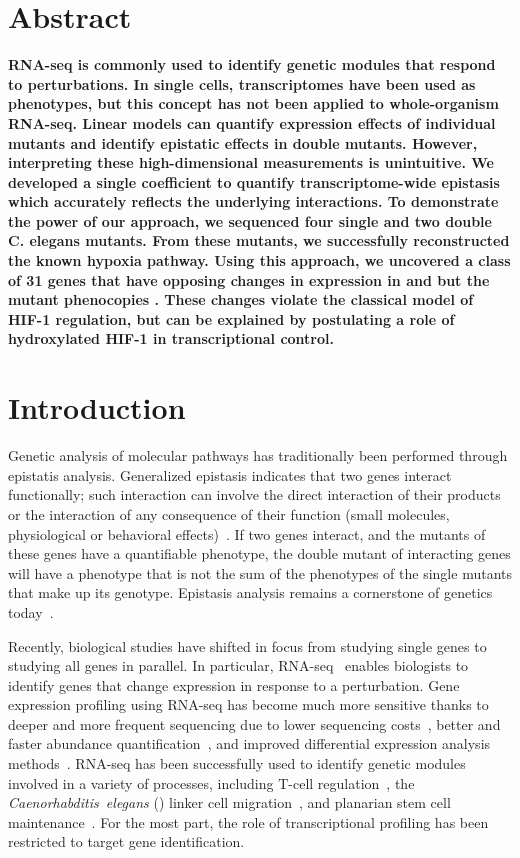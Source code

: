 \section*{Abstract}
\textbf{
RNA-seq is commonly used to identify genetic modules that respond to perturbations.
In single cells, transcriptomes have been used as phenotypes, but this concept
has not been applied to whole-organism RNA-seq. Linear models can quantify
expression effects of individual mutants and identify epistatic effects in double
mutants. However, interpreting these high-dimensional measurements is unintuitive.
We developed a single coefficient to quantify transcriptome-wide epistasis which
accurately reflects the underlying interactions. To demonstrate the power of our
approach, we sequenced four single and two double C. elegans mutants. From these
mutants, we successfully reconstructed the known hypoxia pathway. Using this
approach, we uncovered a class of 31 genes that have opposing changes in expression
in \egl{} and \vhl{} but the \eglvhl{} mutant phenocopies \egl{}.
These changes violate the classical model of HIF-1 regulation, but can be explained
by postulating a role of hydroxylated HIF-1 in transcriptional control.
}
\vspace{10mm}


\section*{Introduction}
\label{sec:introduction}
Genetic analysis of molecular pathways has traditionally been performed
through epistatis analysis. Generalized epistasis indicates that two genes interact
functionally; such interaction can involve the direct interaction of their
products or the interaction of any consequence of their function (small molecules,
physiological or behavioral effects)~\citep{Huang2006}. If two
genes interact, and the mutants of these genes have a quantifiable phenotype,
the double mutant of interacting genes will have a phenotype that is not the sum
of the phenotypes of the single mutants that make up its genotype. Epistasis
analysis remains a cornerstone of genetics today~\citep{Phillips2008}.


Recently, biological studies have shifted in focus from studying single
genes to studying all genes in parallel. In particular,
RNA-seq~\citep{Mortazavi2008} enables biologists to
identify genes that change expression in response to a perturbation. Gene expression
profiling using RNA-seq has become much more sensitive thanks to deeper and more
frequent sequencing due to lower sequencing costs~\citep{Metzker2010},
better and faster abundance quantification~\citep{Patro2014,Bray2016,Patro2015},
and improved differential expression analysis
methods~\citep{Pimentel2016,Trapnell2013}. RNA-seq has been
successfully used to identify genetic modules involved in a variety of processes,
including T-cell regulation~\citep{Singer2016,Shalek2013}, the
\emph{Caenorhabditis~elegans} (\cel{}) linker
cell migration~\citep{Schwarz2012}, and planarian stem cell
maintenance~\citep{VanWolfswinkel2014,Scimone2014}. For the most part, the role of
transcriptional profiling has been restricted to target gene identification.

